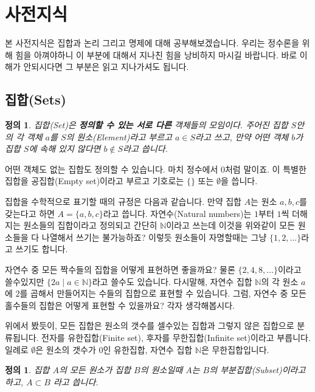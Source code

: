 \documentclass[a4paper, 11pt]{report}
\renewcommand{\<}{\langle}
\renewcommand{\>}{\rangle}
\newtheorem{dfn}[thm]{정의}
\begin{document}
\section{사전지식}

본 사전지식은 집합과 논리 그리고 명제에 대해 공부해보겠습니다. 우리는 정수론을 위해 힘을 아껴야하니
이 부분에 대해서 지나친 힘을 낭비하지 마시길 바랍니다. 바로 이해가 안되시다면 그 부분은 읽고 
지나가셔도 됩니다.

\subsection{집합(Sets)}

\begin{dfn}
집합(Set)은 \textbf{정의할 수 있는 서로 다른} 객체들의 모임이다. 주어진 집합 $S$안의 각 객체 $a$를 
$S$의 원소(Element)라고 부르고 $a \in S$라고 쓰고, 만약 어떤 객체 $b$가 집합 $S$에 속해
있지 않다면 $b \not\in S$라고 씁니다.
\end{dfn}

어떤 객체도 없는 집합도 정의할 수 있습니다. 마치 정수에서 $0$처럼 말이죠. 이 특별한 
집합을 공집합(Empty set)이라고 부르고 기호로는 $\{\}$ 또는 $\emptyset$을 씁니다.

집합을 수학적으로 표기할 때의 규정은 다음과 같습니다. 만약 집합 $A$는 원소 $a, b, c$를 갖는다고 
하면 $A = \{a, b, c\}$라고 씁니다. 자연수(Natural numbers)는 $1$부터 $1$씩 더해지는 원소들의 
집합이라고 정의되고 간단히 $\mathbb{N}$이라고 쓰는데 이것을 위와같이 모든 원소들을 다 나열해서 
쓰기는 불가능하죠? 이렇듯 원소들이 자명할때는 그냥 $\{1, 2, \ldots\}$라고 쓰기도 합니다.

자연수 중 모든 짝수들의 집합을 어떻게 표현하면 좋을까요? 물론 $\{2, 4, 8, \ldots\}$이라고 
쓸수있지만 $\{2a \mid a \in \mathbb{N}\}$라고 쓸수도 있습니다. 다시말해, 자연수 집합 
$\mathbb{N}$의 각 원소 $a$에 $2$를 곱해서 만들어지는 수들의 집합으로 표현할 수 있습니다.
그럼, 자연수 중 모든 홀수들의 집합은 어떻게 표현할 수 있을까요? 각자 생각해봅시다.

위에서 봤듯이, 모든 집합은 원소의 갯수를 셀수있는 집합과 그렇지 않은 집합으로 분류됩니다. 전자를 
유한집합(Finite set), 후자를 무한집합(Infinite set)이라고 부릅니다. 일례로 $\emptyset$은 
원소의 갯수가 $0$인 유한집합, 자연수 집합 $\mathbb{N}$은 무한집합입니다.

\begin{dfn}
  집합 $A$의 모든 원소가 집합 $B$의 원소일때 $A$는 $B$의 부분집합(Subset)이라고 하고, $A \subset B$
  라고 씁니다.
\end{dfn}
\end{document}
